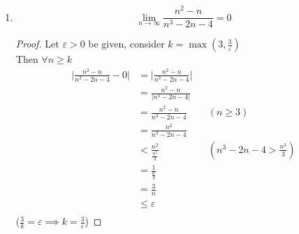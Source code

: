 \documentclass[12pt]{article}
\begin{document}
\begin{enumerate}
\begin{enumerate}
\begin{proof}
\begin{align*}
				                                                        & = \frac{\sqrt{n}}{2n-1}                    \\
				                                                        & < \frac{\sqrt{n}}{2n-n}                    \\
				                                                        & = \frac{1}{\sqrt{n}}                       \\
				                                                        & \leq \varepsilon
			            \end{align*}
			            ($\frac{1}{\sqrt{k}} = \varepsilon \implies \sqrt{k} = \frac{1}{\varepsilon} \implies k = \frac{1}{\varepsilon^2}$)
		            \end{proof}
		      \item \[\lim_{n \to \infty} \frac{n^2-n}{n^3-2n-4} = 0\]
		            \begin{proof}
			            Let $\varepsilon > 0$ be given, consider $k = \max(3, \frac{3}{\varepsilon}) $ \\
			            Then $\forall n \geq k$
			            \begin{align*}
				            \bigg|\frac{n^2-n}{n^3-2n-4} - 0\bigg| & = \bigg|\frac{n^2-n}{n^3-2n-4}\bigg|                                 \\
				                                                   & = \frac{n^2-n}{|n^3-2n-4|}                                           \\
				                                                   & = \frac{n^2-n}{n^3-2n-4}             &  & (n \geq 3)                 \\
				                                                   & = \frac{n^2}{n^3-2n-4}                                               \\
				                                                   & < \frac{n^2}{\frac{n^3}{3}}          &  & (n^3-2n-4 > \frac{n^3}{3}) \\
				                                                   & = \frac{1}{\frac{n}{3}}                                              \\
				                                                   & = \frac{3}{n}                                                        \\
				                                                   & \leq \varepsilon                                                     \\
			            \end{align*}
			            ($\frac{3}{k} = \varepsilon \implies k = \frac{3}{\varepsilon} $)
		            \end{proof}
	      \end{enumerate}
\end{enumerate}
\end{document}
